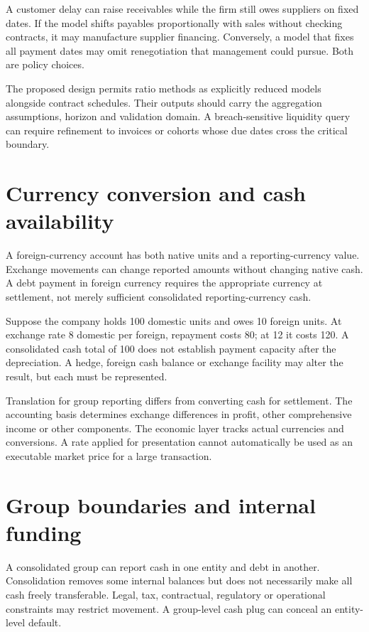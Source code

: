 A customer delay can raise receivables while the firm still owes suppliers on fixed dates. If the model shifts payables proportionally with sales without checking contracts, it may manufacture supplier financing. Conversely, a model that fixes all payment dates may omit renegotiation that management could pursue. Both are policy choices.

The proposed design permits ratio methods as explicitly reduced models alongside contract schedules. Their outputs should carry the aggregation assumptions, horizon and validation domain. A breach-sensitive liquidity query can require refinement to invoices or cohorts whose due dates cross the critical boundary.

\section{Currency conversion and cash availability}
A foreign-currency account has both native units and a reporting-currency value. Exchange movements can change reported amounts without changing native cash. A debt payment in foreign currency requires the appropriate currency at settlement, not merely sufficient consolidated reporting-currency cash.

Suppose the company holds 100 domestic units and owes 10 foreign units. At exchange rate 8 domestic per foreign, repayment costs 80; at 12 it costs 120. A consolidated cash total of 100 does not establish payment capacity after the depreciation. A hedge, foreign cash balance or exchange facility may alter the result, but each must be represented.

Translation for group reporting differs from converting cash for settlement. The accounting basis determines exchange differences in profit, other comprehensive income or other components. The economic layer tracks actual currencies and conversions. A rate applied for presentation cannot automatically be used as an executable market price for a large transaction.

\section{Group boundaries and internal funding}
A consolidated group can report cash in one entity and debt in another. Consolidation removes some internal balances but does not necessarily make all cash freely transferable. Legal, tax, contractual, regulatory or operational constraints may restrict movement. A group-level cash plug can conceal an entity-level default.

